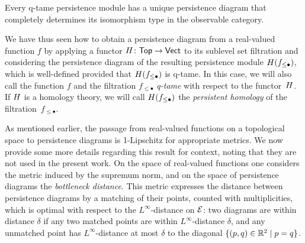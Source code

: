 \begin{thm} \label{t:q-tame modules have barcodes}
	Every q-tame persistence module has a unique persistence diagram that completely determines its isomorphism type in the observable category.
\end{thm}

We have thus seen how to obtain a persistence diagram from a real-valued function $f$ by applying a functor $H \colon \mathsf{Top} \to \mathsf{Vect}$ to its sublevel set filtration and considering the persistence diagram of the resulting persistence module $H(f_{\leq \bullet})$, which is well-defined provided that $H(f_{\leq \bullet})$ is q-tame.
In this case, we will also call the function $f$ and the filtration $f_{\leq \bullet}$ \emph{q-tame} with respect to the functor~$H$.
If $H$ is a homology theory, we will call $H(f_{\leq \bullet})$ the \emph{persistent homology} of the filtration~$f_{\leq \bullet}$.

As mentioned earlier, the passage from real-valued functions on a topological space to persistence diagrams is 1-Lipschitz for appropriate metrics.
We now provide some more details regarding this result for context, noting that they are not used in the present work.
On the space of real-valued functions one considers the metric induced by the supremum norm, and on the space of persistence diagrams the \emph{bottleneck distance}.
This metric expresses the distance between persistence diagrams by a matching of their points, counted with multiplicities, which is optimal with respect to the $L^{\infty}$-distance on $\mathcal{E}$: two diagrams are within distance $\delta$ if any two matched points are within $L^{\infty}$-distance $\delta$, and any unmatched point has $L^{\infty}$-distance at most $\delta$ to the diagonal $\{(p,q) \in \mathbb{R}^2 \mid p = q\}$.

